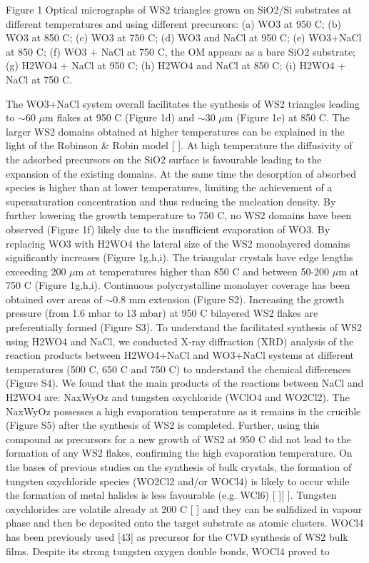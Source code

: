 \documentclass[12pt]{article}
\begin{document}
Figure 1 Optical micrographs of WS2 triangles grown on SiO2/Si substrates at different temperatures and using different precursors: (a) WO3 at  950 {\degree}C; (b) WO3 at 850 {\degree}C; (c) WO3 at 750 {\degree}C; (d) WO3 and NaCl at 950 {\degree}C; (e) WO3+NaCl at 850 {\degree}C; (f) WO3 + NaCl at 750 {\degree}C, the OM appears as a bare SiO2 substrate; (g) H2WO4 + NaCl at 950 {\degree}C; (h) H2WO4 and NaCl at 850 {\degree}C; (i) H2WO4 + NaCl at 750 {\degree}C.
                                        
The WO3+NaCl system overall facilitates the synthesis of WS2 triangles leading to {$\sim$}60 {$\mu$}m flakes at 950 {\degree}C (Figure 1d) and {$\sim$}30 {$\mu$}m (Figure 1e) at 850 {\degree}C. The larger WS2 domains obtained at higher temperatures can be explained in the light of the Robinson \& Robin model [ ]. At high temperature the diffusivity of the adsorbed precursors on the SiO2 surface is favourable leading to the expansion of the existing domains. At the same time the desorption of absorbed species is higher than at lower temperatures, limiting the achievement of a supersaturation concentration and thus reducing the nucleation density. By further lowering the growth temperature to 750 {\degree}C, no WS2 domains have been observed (Figure 1f) likely due to the insufficient evaporation of WO3.                                                                                              By replacing WO3 with H2WO4 the lateral size of the WS2 monolayered domains significantly increases (Figure 1g,h,i). The triangular crystals have edge lengths exceeding 200 {$\mu$}m at temperatures higher than 850 {\degree}C and between 50-200 {$\mu$}m at 750 {\degree}C (Figure 1g,h,i). Continuous polycrystalline monolayer coverage has been obtained over areas of {$\sim$}0.8 mm extension (Figure S2). Increasing the growth pressure (from 1.6 mbar to 13 mbar) at 950 {\degree}C bilayered WS2 flakes are preferentially formed (Figure S3). To understand the facilitated synthesis of WS2 using H2WO4 and NaCl, we conducted X-ray diffraction (XRD) analysis of the reaction products between H2WO4+NaCl and WO3+NaCl systems at different temperatures (500 {\degree}C, 650 {\degree}C and 750 {\degree}C) to understand the chemical differences (Figure S4). We found that the main products of the reactions between NaCl and H2WO4 are: NaxWyOz and tungsten oxychloride (WClO4 and WO2Cl2). The NaxWyOz possesses a high evaporation temperature as it remains in the crucible (Figure S5) after the synthesis of WS2 is completed. Further, using this compound as precursors for a new growth of WS2 at 950 {\degree}C did not lead to the formation of any WS2 flakes, confirming the high evaporation temperature. On the bases of previous studies on the synthesis of bulk crystals, the formation of tungsten oxychloride species (WO2Cl2 and/or WOCl4) is likely to occur while the formation of metal halides is less favourable (e.g. WCl6) [ ][ ]. Tungsten oxychlorides are volatile already at 200 {\degree}C [ ] and they can be sulfidized in vapour phase and then be deposited onto the target substrate as atomic clusters. WOCl4 has been previously used [43] as precursor for the CVD synthesis of WS2 bulk films. Despite its strong tungsten oxygen double bonds, WOCl4 proved to 
\end{document}
